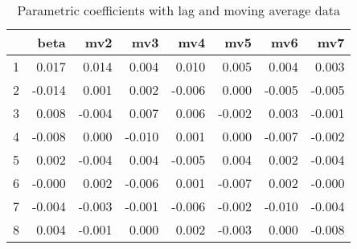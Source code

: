 \documentclass[a4paper, 12pt]{article}
\begin{document}
\begin{table}[h]
\centering
\caption{Parametric coefficients with lag and moving average data}
\begin{tabular}{rrrrrrrr}
  \hline
 & beta & mv2 & mv3 & mv4 & mv5 & mv6 & mv7 \\
  \hline
1 & 0.017 & 0.014 & 0.004 & 0.010 & 0.005 & 0.004 & 0.003 \\
  2 & -0.014 & 0.001 & 0.002 & -0.006 & 0.000 & -0.005 & -0.005 \\
  3 & 0.008 & -0.004 & 0.007 & 0.006 & -0.002 & 0.003 & -0.001 \\
  4 & -0.008 & 0.000 & -0.010 & 0.001 & 0.000 & -0.007 & -0.002 \\
  5 & 0.002 & -0.004 & 0.004 & -0.005 & 0.004 & 0.002 & -0.004 \\
  6 & -0.000 & 0.002 & -0.006 & 0.001 & -0.007 & 0.002 & -0.000 \\
  7 & -0.004 & -0.003 & -0.001 & -0.006 & -0.002 & -0.010 & -0.004 \\
  8 & 0.004 & -0.001 & 0.000 & 0.002 & -0.003 & 0.000 & -0.008 \\
   \hline
\end{tabular}
\end{table}
\clearpage
\end{document}

